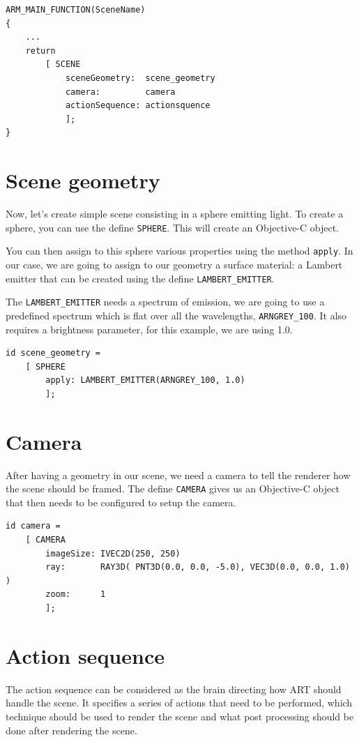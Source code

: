 \documentclass[a4paper,chapterprefix]{scrbook}
\begin{document}
\begin{lstlisting}
ARM_MAIN_FUNCTION(SceneName)
{
    ...
    return 
        [ SCENE
            sceneGeometry:  scene_geometry
            camera:         camera
            actionSequence: actionsquence
            ];
}
\end{lstlisting}

\section{Scene geometry}
Now, let's create simple scene consisting in a sphere emitting light. To create a sphere, you can use the define \verb?SPHERE?. This will create an Objective-C object. 

You can then assign to this sphere various properties using the method \verb?apply?.
In our case, we are going to assign to our geometry a surface material: a Lambert emitter that can be created using the define \verb?LAMBERT_EMITTER?.

The  \verb?LAMBERT_EMITTER? needs a spectrum of emission, we are going to use a predefined spectrum which is flat over all the wavelengths, \verb?ARNGREY_100?. It also requires a brightness parameter, for this example, we are using 1.0.

\begin{lstlisting}
id scene_geometry = 
    [ SPHERE 
        apply: LAMBERT_EMITTER(ARNGREY_100, 1.0) 
        ];
\end{lstlisting}

\section{Camera}
After having a geometry in our scene, we need a camera to tell the renderer how the scene should be framed. The define \verb?CAMERA? gives us an Objective-C object that then needs to be configured to setup the camera. 

\begin{lstlisting}
id camera =
    [ CAMERA
        imageSize: IVEC2D(250, 250)
        ray:       RAY3D( PNT3D(0.0, 0.0, -5.0), VEC3D(0.0, 0.0, 1.0) )
        zoom:      1
        ];
\end{lstlisting}

\section{Action sequence}
The action sequence can be considered as the brain directing how ART should handle the scene. It specifies a series of actions that need to be performed, which technique should be used to render the scene and what post processing should be done after rendering the scene.
\end{document}
